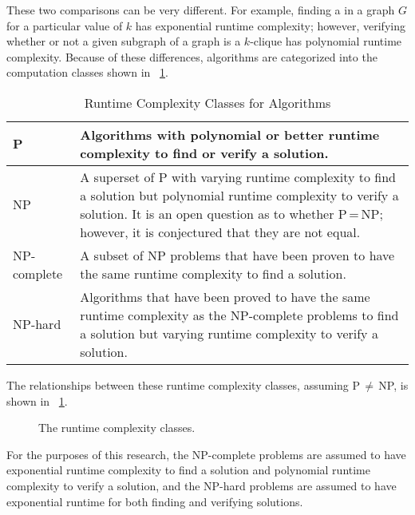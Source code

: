 These two comparisons can be very different.  For example, finding a  in a graph \(G\) for a particular
value of \(k\) has exponential runtime complexity; however, verifying whether or not a given subgraph of a graph is
a \(k\)-clique has polynomial runtime complexity.  Because of these differences, algorithms are categorized into
the computation classes shown in \tablename~\ref{tab:classes}.

\begin{table}[H]
  \centering
  \caption{Runtime Complexity Classes for Algorithms}
  \label{tab:classes}
  \setlength{\extrarowheight}{2ex}
  \begin{tabular}{|m{1in}|m{3in}|}
    \hline
    P & Algorithms with polynomial or better runtime complexity to find or verify a solution. \\
    \hline
    NP & A superset of P with varying runtime complexity to find a solution but polynomial runtime complexity
    to verify a solution.  It is an open question as to whether P\,=\,NP; however, it is conjectured that they are not
    equal. \\
    \hline
    NP-complete & A subset of NP problems that have been proven to have the same runtime complexity to find a
    solution. \\
    \hline
    NP-hard & Algorithms that have been proved to have the same runtime complexity as the NP-complete
    problems to find a solution but varying runtime complexity to verify a solution. \\
    \hline
  \end{tabular}
\end{table}

The relationships between these runtime complexity classes, assuming P\,\(\ne\)\,NP, is shown in
\figurename~\ref{fig:complexity}.

\begin{figure}[H]
  \centering
  \caption{The runtime complexity classes.}
  \label{fig:complexity}
\end{figure}

For the purposes of this research, the NP-complete problems are assumed to have exponential runtime complexity to
find a solution and polynomial runtime complexity to verify a solution, and the NP-hard problems are assumed to
have exponential runtime for both finding and verifying solutions.

